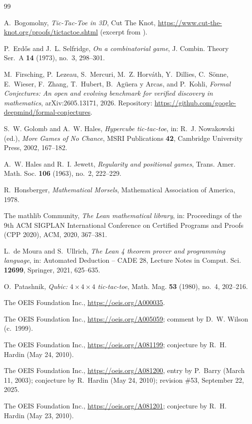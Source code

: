 \documentclass[11pt]{amsart}
\theoremstyle{plain}
\theoremstyle{definition}
\begin{document}
{\footnotesize
\begin{thebibliography}{99}

A.~Bogomolny, \emph{Tic-Tac-Toe in 3D}, Cut The Knot, \url{https://www.cut-the-knot.org/proofs/tictactoe.shtml} (excerpt from \cite{Ho}).

P.~Erd\H{o}s and J.~L. Selfridge, \emph{On a combinatorial game}, J. Combin. Theory Ser.~A \textbf{14} (1973), no.~3, 298--301.

M.~Firsching, P.~Lezeau, S.~Mercuri, M.~Z. Horv\'ath, Y.~Dillies, C.~S\"onne, E.~Wieser, F.~Zhang, T.~Hubert, B.~Ag\"uera y Arcas, and P.~Kohli, \emph{Formal Conjectures: An open and evolving benchmark for verified discovery in mathematics}, arXiv:2605.13171, 2026. Repository: \url{https://github.com/google-deepmind/formal-conjectures}.

S.~W. Golomb and A.~W. Hales, \emph{Hypercube tic-tac-toe}, in: R.~J. Nowakowski (ed.), \emph{More Games of No Chance}, MSRI Publications \textbf{42}, Cambridge University Press, 2002, 167--182.

A.~W. Hales and R.~I. Jewett, \emph{Regularity and positional games}, Trans. Amer. Math. Soc. \textbf{106} (1963), no.~2, 222--229.

R.~Honsberger, \emph{Mathematical Morsels}, Mathematical Association of America, 1978.

The mathlib Community, \emph{The Lean mathematical library}, in: Proceedings of the 9th ACM SIGPLAN International Conference on Certified Programs and Proofs (CPP 2020), ACM, 2020, 367--381.

L.~de Moura and S.~Ullrich, \emph{The Lean 4 theorem prover and programming language}, in: Automated Deduction -- CADE 28, Lecture Notes in Comput. Sci. \textbf{12699}, Springer, 2021, 625--635.

O.~Patashnik, \emph{Qubic: $4\times4\times4$ tic-tac-toe}, Math. Mag. \textbf{53} (1980), no.~4, 202--216.

The OEIS Foundation Inc., \url{https://oeis.org/A000035}.

The OEIS Foundation Inc., \url{https://oeis.org/A005059}; comment by D.~W. Wilson (c.~1999).

The OEIS Foundation Inc., \url{https://oeis.org/A081199}; conjecture by R.~H. Hardin (May 24, 2010).

The OEIS Foundation Inc., \url{https://oeis.org/A081200}, entry by P.~Barry (March 11, 2003); conjecture by R.~Hardin (May 24, 2010); revision \#53, September 22, 2025.

The OEIS Foundation Inc., \url{https://oeis.org/A081201}; conjecture by R.~H. Hardin (May 23, 2010).

\end{thebibliography}
}
\end{document}
